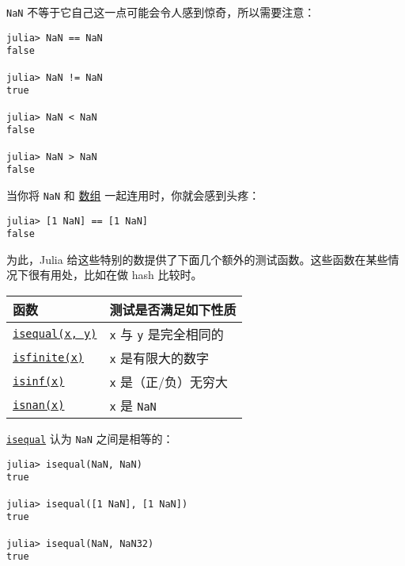 \texttt{NaN} 不等于它自己这一点可能会令人感到惊奇，所以需要注意：




\begin{verbatim}
julia> NaN == NaN
false

julia> NaN != NaN
true

julia> NaN < NaN
false

julia> NaN > NaN
false
\end{verbatim}



当你将 \texttt{NaN} 和 \hyperlink{16720099245556932994}{数组} 一起连用时，你就会感到头疼：




\begin{verbatim}
julia> [1 NaN] == [1 NaN]
false
\end{verbatim}



为此，Julia 给这些特别的数提供了下面几个额外的测试函数。这些函数在某些情况下很有用处，比如在做 hash 比较时。




\begin{table}[h]

\begin{tabulary}{\linewidth}{|L|L|}
\hline
函数 & 测试是否满足如下性质 \\
\hline
\hyperlink{269533589463185031}{\texttt{isequal(x, y)}} & \texttt{x} 与 \texttt{y} 是完全相同的 \\
\hline
\hyperlink{2906021895910968108}{\texttt{isfinite(x)}} & \texttt{x} 是有限大的数字 \\
\hline
\hyperlink{4492113908831448207}{\texttt{isinf(x)}} & \texttt{x} 是（正/负）无穷大 \\
\hline
\hyperlink{6770390199496851634}{\texttt{isnan(x)}} & \texttt{x} 是 \texttt{NaN} \\
\hline
\end{tabulary}

\end{table}



\hyperlink{269533589463185031}{\texttt{isequal}} 认为 \texttt{NaN} 之间是相等的：




\begin{verbatim}
julia> isequal(NaN, NaN)
true

julia> isequal([1 NaN], [1 NaN])
true

julia> isequal(NaN, NaN32)
true
\end{verbatim}



